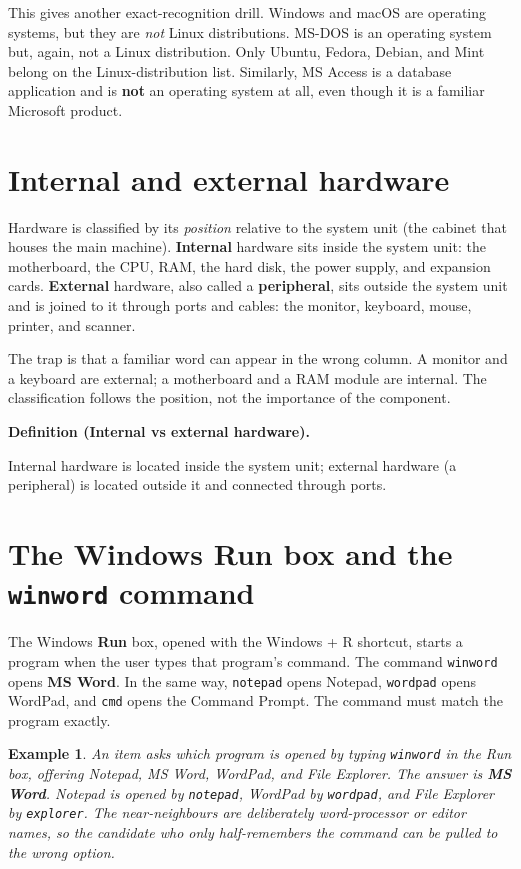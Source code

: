 \documentclass[11pt]{article}
\newtheorem{example}{Example}[section]
\newenvironment{definitionbox}[1]{%
  \par\noindent\textbf{Definition (#1).}\ \itshape
}{\par\vspace{0.3em}}
\begin{document}
This gives another exact-recognition drill. Windows and macOS are operating
systems, but they are \emph{not} Linux distributions. MS-DOS is an operating
system but, again, not a Linux distribution. Only Ubuntu, Fedora, Debian, and
Mint belong on the Linux-distribution list. Similarly, MS Access is a
database application and is \textbf{not} an operating system at all, even
though it is a familiar Microsoft product.

\section{Internal and external hardware}
Hardware is classified by its \emph{position} relative to the system unit
(the cabinet that houses the main machine). \textbf{Internal} hardware sits
inside the system unit: the motherboard, the CPU, RAM, the hard disk, the
power supply, and expansion cards. \textbf{External} hardware, also called a
\textbf{peripheral}, sits outside the system unit and is joined to it through
ports and cables: the monitor, keyboard, mouse, printer, and scanner.

The trap is that a familiar word can appear in the wrong column. A monitor
and a keyboard are external; a motherboard and a RAM module are internal. The
classification follows the position, not the importance of the component.

\begin{definitionbox}{Internal vs external hardware}
Internal hardware is located inside the system unit; external hardware
(a peripheral) is located outside it and connected through ports.
\end{definitionbox}

\section{The Windows Run box and the \texttt{winword} command}
The Windows \textbf{Run} box, opened with the Windows + R shortcut, starts a
program when the user types that program's command. The command
\texttt{winword} opens \textbf{MS Word}. In the same way,
\texttt{notepad} opens Notepad, \texttt{wordpad} opens WordPad, and
\texttt{cmd} opens the Command Prompt. The command must match the program
exactly.

\begin{example}
An item asks which program is opened by typing \texttt{winword} in the Run
box, offering Notepad, MS Word, WordPad, and File Explorer. The answer is
\textbf{MS Word}. Notepad is opened by \texttt{notepad}, WordPad by
\texttt{wordpad}, and File Explorer by \texttt{explorer}. The near-neighbours
are deliberately word-processor or editor names, so the candidate who only
half-remembers the command can be pulled to the wrong option.
\end{example}
\end{document}
